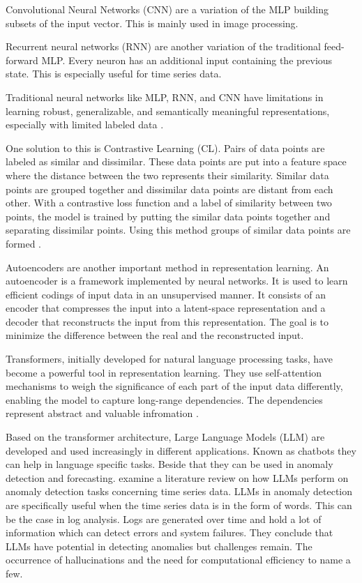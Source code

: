 Convolutional Neural Networks (CNN) are a variation of the MLP building subsets of the input vector. This is mainly used in image processing.

Recurrent neural networks (RNN) are another variation of the traditional feed-forward MLP. Every neuron has an additional input containing the previous state. This is especially useful for time series data.

Traditional neural networks like MLP, RNN, and CNN have limitations in learning robust, generalizable, and semantically meaningful representations, especially with limited labeled data \cite{shi_trade-off_2023}.

One solution to this is Contrastive Learning (CL). Pairs of data points are labeled as similar and dissimilar. These data points are put into a feature space where the distance between the two represents their similarity. Similar data points are grouped together and dissimilar data points are distant from each other. With a contrastive loss function and a label of similarity between two points, the model is trained by putting the similar data points together and separating dissimilar points. Using this method groups of similar data points are formed \cite{shi_trade-off_2023}.

Autoencoders are another important method in representation learning. An autoencoder is a framework implemented by neural networks. It is used to learn efficient codings of input data in an unsupervised manner. It consists of an encoder that compresses the input into a latent-space representation and a decoder that reconstructs the input from this representation. The goal is to minimize the difference between the real and the reconstructed input.

Transformers, initially developed for natural language processing tasks, have become a powerful tool in representation learning. They use self-attention mechanisms to weigh the significance of each part of the input data differently, enabling the model to capture long-range dependencies. The dependencies represent abstract and valuable infromation \cite{vaswani_attention_2017}.

Based on the transformer architecture, Large Language Models (LLM) are developed and used increasingly in different applications. Known as chatbots they can help in language specific tasks. Beside that they can be used in anomaly detection and forecasting. \cite{su_large_2024} examine a literature review on how LLMs perform on anomaly detection tasks concerning time series data. LLMs in anomaly detection are specifically useful when the time series data is in the form of words. This can be the case in log analysis. Logs are generated over time and hold a lot of information which can detect errors and system failures. They conclude that LLMs have potential in detecting anomalies but challenges remain. The occurrence of hallucinations and the need for computational efficiency to name a few.

